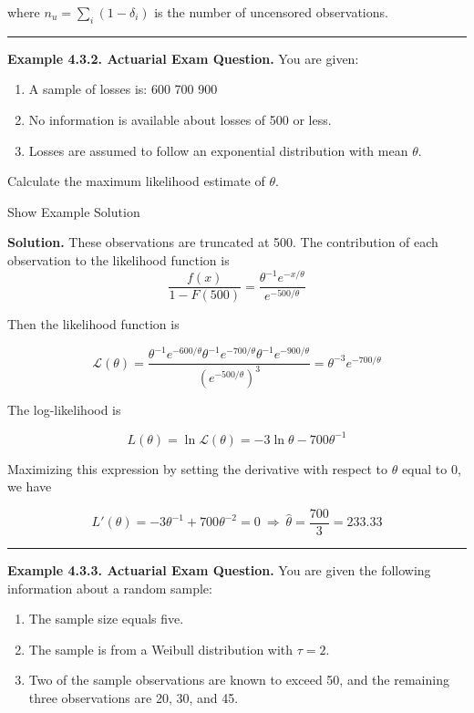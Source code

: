 \documentclass[]{book}
\providecommand{\tightlist}{%
  \setlength{\itemsep}{0pt}\setlength{\parskip}{0pt}}
\theoremstyle{definition}
\theoremstyle{definition}
\theoremstyle{definition}
\theoremstyle{remark}
\begin{document}
where \(n_u = \sum_i (1-\delta_i)\) is the number of uncensored
observations.

\begin{center}\rule{0.5\linewidth}{\linethickness}\end{center}

\textbf{Example 4.3.2. Actuarial Exam Question.} You are given:

\begin{enumerate}
\def\labelenumi{(\roman{enumi})}
\tightlist
\item
  A sample of losses is: 600 700 900
\item
  No information is available about losses of 500 or less.
\item
  Losses are assumed to follow an exponential distribution with mean
  \(\theta\).
\end{enumerate}

Calculate the maximum likelihood estimate of \(\theta\).

Show Example Solution

\hypertarget{toggleExampleSelect.3.2}{}
\textbf{Solution.} These observations are truncated at 500. The
contribution of each observation to the likelihood function is
\[\frac{f(x)}{1-F(500)} = \frac{\theta^{-1}e^{-x/\theta}}{e^{-500/\theta}}\]

Then the likelihood function is

\[\mathcal{L}(\theta)= \frac{\theta^{-1} e^{-600/\theta} \theta^{-1} e^{-700/\theta} \theta^{-1} e^{-900/\theta}}{(e^{-500/\theta})^3} = \theta^{-3}e^{-700/\theta}\]

The log-likelihood is

\[L(\theta) = \ln\mathcal{L}(\theta) = -3\ln \theta - 700\theta^{-1}\]

Maximizing this expression by setting the derivative with respect to
\(\theta\) equal to 0, we have

\[L'(\theta) = -3\theta^{-1} + 700\theta^{-2} = 0 \ \Rightarrow \ \hat{\theta} = \frac{700}{3} = 233.33\]

\begin{center}\rule{0.5\linewidth}{\linethickness}\end{center}

\textbf{Example 4.3.3. Actuarial Exam Question.} You are given the
following information about a random sample:

\begin{enumerate}
\def\labelenumi{(\roman{enumi})}
\tightlist
\item
  The sample size equals five.
\item
  The sample is from a Weibull distribution with \(\tau=2\).
\item
  Two of the sample observations are known to exceed 50, and the
  remaining three observations are 20, 30, and 45.
\end{enumerate}
\end{document}
